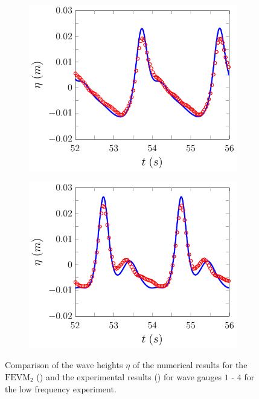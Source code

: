 \begin{figure}
	\begin{subfigure}{0.5\textwidth}
		\includegraphics[width=\textwidth]{./chp6/figures/Experiment/Beji/sl/FEVMWG3.pdf}
		\vspace{0.5cm}
	\end{subfigure}%
	\begin{subfigure}{0.5\textwidth}
		\includegraphics[width=\textwidth]{./chp6/figures/Experiment/Beji/sl/FEVMWG4.pdf}
		\vspace{0.5cm}
	\end{subfigure}
	\caption{Comparison of the wave heights $\eta$ of the numerical results for the $\text{FEVM}_2$ ({\color{blue}\solidrule}) and the experimental results () for wave gauges $1$ - $4$ for the low frequency experiment.}
	\label{fig:BejislWG1to4FEVM}
\end{figure}

